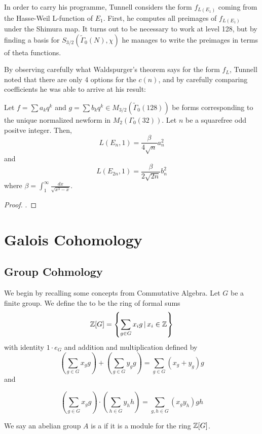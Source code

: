 \documentclass[12pt, a4paper]{report}
\begin{document}
In order to carry his programme, Tunnell considers the form $f_{L(E_1)}$ coming
from the Hasse-Weil L-function of $E_1$.  First, he computes all preimages of
$f_{L(E_1)}$
under the Shimura map.
It turns out to be necessary to work at level 128, but by finding a basis
for $S_{3/2}(\tilde{\Gamma}_0(N), \chi)$ he manages to write the preimages in
terms of theta functions.

By observing carefully what Waldspurger's theorem
says for the form $f_L$, Tunnell noted that
there are only 4 options for the $c(n)$, and by carefully comparing coefficients
he was able to arrive at his result:

\begin{thm}
  Let $f = \sum a_k q^k$ and $g = \sum b_k q^k \in
  M_{3/2}(\tilde{\Gamma}_0(128))$ be forms corresponding to the unique
  normalized newform
  in $M_2(\Gamma_0(32))$. Let $n$ be a squarefree odd positve integer. Then,
  \[L(E_n,1) = \frac{\beta}{4\sqrt{n}} a_n^2 \]
  and
  \[L(E_{2n},1) = \frac{\beta}{2 \sqrt{2n}} b_n^2 \]
  where $\beta = \int_1^\infty \frac{dx}{\sqrt{x^3-x}}.$
\end{thm}
\begin{proof}
  \cite[See][Theorem 3, Page 328-329]{Tunnell}.
\end{proof}

\newpage

\chapter{Galois Cohomology}

\section{Group Cohmology}

We begin by recalling some concepts from Commutative Algebra.
Let $G$ be a finite group. We define the  to
be the ring of formal sums
\[ {\mathbb Z}[G] = \left\{ \sum\limits_{g \in G} x_i g \, | \, x_i \in {\mathbb Z}  \right\} \]
with identity $1 \cdot e_G$ and addition and multiplication defined by
\[\left( \sum\limits_{g \in G} x_g g \right) + \left( \sum\limits_{g \in G} y_g
    g \right)
= \sum\limits_{g \in G} (x_g+y_g)g\]
and

\[\left( \sum\limits_{g \in G} x_g g \right) \cdot \left( \sum\limits_{h \in G} y_h
    h \right)
= \sum\limits_{g, h \in G} (x_gy_h)gh\]

We say an abelian group $A$ is a  if it is a module
for the ring ${\mathbb Z}[G]$. 
\end{document}
